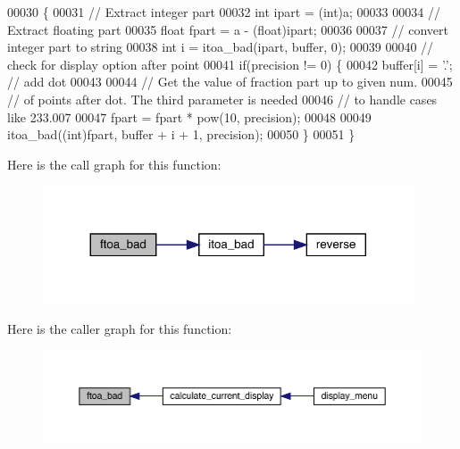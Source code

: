\begin{DoxyCode}
00030                                                     \{
00031   \textcolor{comment}{// Extract integer part}
00032   \textcolor{keywordtype}{int} ipart = (int)a;
00033 
00034   \textcolor{comment}{// Extract floating part}
00035   \textcolor{keywordtype}{float} fpart = a - (float)ipart;
00036 
00037   \textcolor{comment}{// convert integer part to string}
00038   \textcolor{keywordtype}{int} i = itoa_bad(ipart, buffer, 0);
00039 
00040   \textcolor{comment}{// check for display option after point}
00041   \textcolor{keywordflow}{if}(precision != 0) \{
00042     buffer[i] = \textcolor{charliteral}{'.'};  \textcolor{comment}{// add dot}
00043 
00044     \textcolor{comment}{// Get the value of fraction part up to given num.}
00045     \textcolor{comment}{// of points after dot. The third parameter is needed}
00046     \textcolor{comment}{// to handle cases like 233.007}
00047     fpart = fpart * pow(10, precision);
00048 
00049     itoa_bad((\textcolor{keywordtype}{int})fpart, buffer + i + 1, precision);
00050   \}
00051 \}
\end{DoxyCode}
Here is the call graph for this function\+:\nopagebreak
\begin{figure}[H]
\begin{center}
\leavevmode
\includegraphics[width=311pt]{vlib_8c_a8805990ed667939e615e4a98950b8bd1_cgraph}
\end{center}
\end{figure}
Here is the caller graph for this function\+:\nopagebreak
\begin{figure}[H]
\begin{center}
\leavevmode
\includegraphics[width=350pt]{vlib_8c_a8805990ed667939e615e4a98950b8bd1_icgraph}
\end{center}
\end{figure}
\mbox{\label{vlib_8c_a08fa7134f8b9a80eeba25f9feab22892}} 

